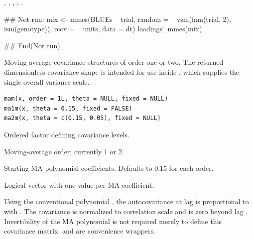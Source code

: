 \documentclass[a4paper]{book}
\begin{document}
%
\begin{SeeAlso}\relax
{}, , , , .
\end{SeeAlso}
%
\begin{Examples}
\begin{ExampleCode}
## Not run: 
mix <- mmes(BLUEs ~ trial,
            random = ~ vsm(fam(trial, 2), ism(genotype)),
            rcov = ~ units, data = dt)
loadings_mmes(mix)

## End(Not run)
\end{ExampleCode}
\end{Examples}
%
\begin{Description}\relax
Moving-average covariance structures of order one or two. The returned dimensionless covariance shape is intended for use inside , which supplies the single overall variance scale.
\end{Description}
%
\begin{Usage}
\begin{verbatim}
mam(x, order = 1L, theta = NULL, fixed = NULL)
ma1m(x, theta = 0.15, fixed = FALSE)
ma2m(x, theta = c(0.15, 0.05), fixed = NULL)
\end{verbatim}
\end{Usage}
%
\begin{Arguments}
\begin{ldescription}
\item[\code{x}] Ordered factor defining covariance levels.
\item[\code{order}] Moving-average order; currently 1 or 2.
\item[\code{theta}] Starting MA polynomial coefficients.  Defaults to 0.15 for each order.
\item[\code{fixed}] Logical vector with one value per MA coefficient.
\end{ldescription}
\end{Arguments}
%
\begin{Details}\relax
Using the conventional polynomial , the autocovariance at lag  is proportional to  with .  The covariance is normalized to correlation scale and is zero beyond lag .  Invertibility of the MA polynomial is not required merely to define this covariance matrix.   and  are convenience wrappers.
\end{Details}
\end{document}
